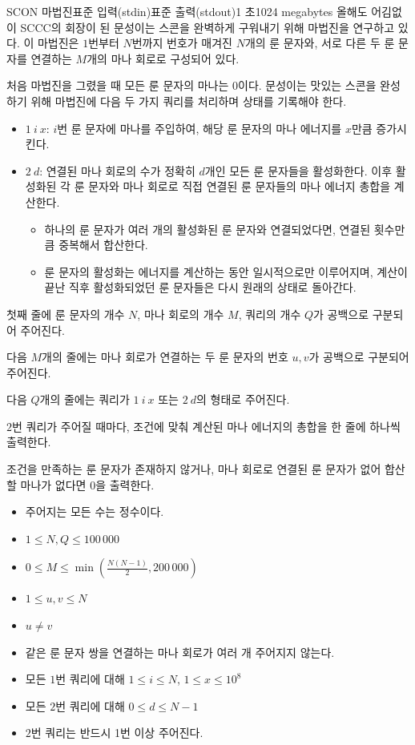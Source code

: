 \def\probtitle{SCON 마법진}
\def\probno{J} %
\begin{problem}{\probtitle}{표준 입력(stdin)}{표준 출력(stdout)}{1 초}{1024 megabytes} 
올해도 어김없이 SCCC의 회장이 된 문성이는 스콘을 완벽하게 구워내기 위해 마법진을 연구하고 있다. 이 마법진은 $1$번부터 $N$번까지 번호가 매겨진 $N$개의 룬 문자와, 서로 다른 두 룬 문자를 연결하는 $M$개의 마나 회로로 구성되어 있다. 

처음 마법진을 그렸을 때 모든 룬 문자의 마나는 0이다. 문성이는 맛있는 스콘을 완성하기 위해 마법진에 다음 두 가지 쿼리를 처리하며 상태를 기록해야 한다. 

\begin{itemize}[topsep=0pt,noitemsep] 
    \item $1~i~x$: $i$번 룬 문자에 마나를 주입하여, 해당 룬 문자의 마나 에너지를 $x$만큼 증가시킨다. 
    \item $2~d$: 연결된 마나 회로의 수가 정확히 $d$개인 모든 룬 문자들을 활성화한다. 이후 활성화된 각 룬 문자와 마나 회로로 직접 연결된 룬 문자들의 마나 에너지 총합을 계산한다. 
    \begin{itemize}[topsep=0pt,noitemsep] 
        \item 하나의 룬 문자가 여러 개의 활성화된 룬 문자와 연결되었다면, 연결된 횟수만큼 중복해서 합산한다. 
        \item 룬 문자의 활성화는 에너지를 계산하는 동안 일시적으로만 이루어지며, 계산이 끝난 직후 활성화되었던 룬 문자들은 다시 원래의 상태로 돌아간다. 
    \end{itemize}
\end{itemize} 

\InputFile 
첫째 줄에 룬 문자의 개수 $N$, 마나 회로의 개수 $M$, 쿼리의 개수 $Q$가 공백으로 구분되어 주어진다. 

다음 $M$개의 줄에는 마나 회로가 연결하는 두 룬 문자의 번호 $u, v$가 공백으로 구분되어 주어진다.

다음 $Q$개의 줄에는 쿼리가 $1~i~x$ 또는 $2~d$의 형태로 주어진다. 

\OutputFile 
$2$번 쿼리가 주어질 때마다, 조건에 맞춰 계산된 마나 에너지의 총합을 한 줄에 하나씩 출력한다.

조건을 만족하는 룬 문자가 존재하지 않거나, 마나 회로로 연결된 룬 문자가 없어 합산할 마나가 없다면 $0$을 출력한다.

\Constraints 
\begin{itemize}[topsep=0pt,noitemsep] 
    \item 주어지는 모든 수는 정수이다. 
    \item $1 \le N, Q \le 100\,000$ 
    \item $0 \le M \le \min(\frac{N(N-1)}{2}, 200\,000)$ 
    \item $1 \le u, v \le N$ 
    \item $u \ne v$
    \item 같은 룬 문자 쌍을 연결하는 마나 회로가 여러 개 주어지지 않는다.
    \item 모든 $1$번 쿼리에 대해 $1 \le i \le N$, $1 \le x \le 10^8$ 
    \item 모든 $2$번 쿼리에 대해 $0 \le d \le N-1$
    \item $2$번 쿼리는 반드시 1번 이상 주어진다.
\end{itemize} 


\end{problem}
